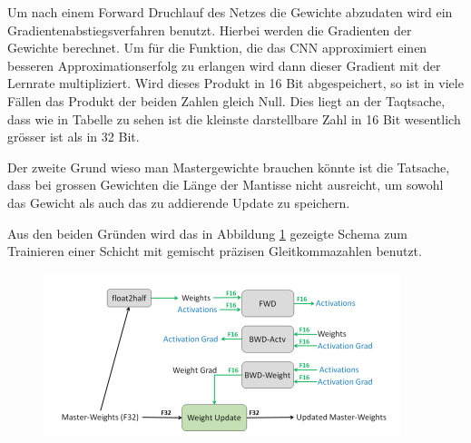 Um nach einem Forward Druchlauf des Netzes die Gewichte abzudaten wird ein Gradientenabstiegsverfahren benutzt. Hierbei werden die Gradienten der Gewichte berechnet. Um für die Funktion, die das CNN approximiert einen besseren Approximationserfolg zu erlangen wird dann dieser Gradient mit der Lernrate multipliziert. Wird dieses Produkt in 16 Bit abgespeichert, so ist in viele Fällen das Produkt der beiden Zahlen gleich Null. Dies liegt an der Taqtsache, dass wie in Tabelle  zu sehen ist die kleinste darstellbare Zahl in 16 Bit wesentlich grösser ist als in 32 Bit.


Der zweite Grund wieso man Mastergewichte brauchen könnte ist die Tatsache, dass bei grossen Gewichten die Länge der Mantisse nicht ausreicht, um sowohl das Gewicht als auch das zu  addierende Update zu speichern.

Aus den beiden Gründen wird das in Abbildung \ref{abb:mixed} gezeigte Schema zum Trainieren einer Schicht mit gemischt präzisen Gleitkommazahlen benutzt.

\begin{figure}[h]
 \centering
 \includegraphics[width=0.8 \textwidth]{KapitelPartA/images/mixed.png}
 \label{abb:mixed}
\end{figure}



